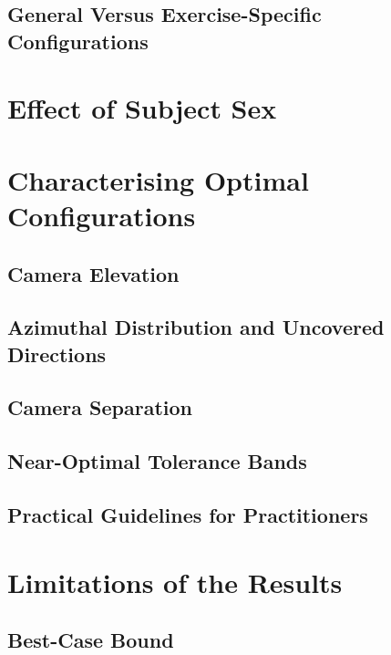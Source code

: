 \subsection{General Versus Exercise-Specific Configurations}

\section{Effect of Subject Sex}
\label{sec:sexeffect}

\section{Characterising Optimal Configurations}
\label{sec:characterisation}

\subsection{Camera Elevation}

\subsection{Azimuthal Distribution and Uncovered Directions}

\subsection{Camera Separation}

\subsection{Near-Optimal Tolerance Bands}

\subsection{Practical Guidelines for Practitioners}

\section{Limitations of the Results}
\label{sec:resultslimitations}

\subsection{Best-Case Bound}


